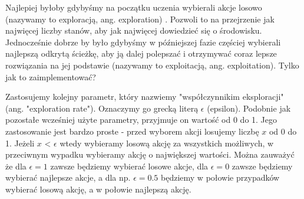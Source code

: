 \documentclass[a4paper,12pt]{article}
\begin{document}
Najlepiej byłoby gdybyśmy na początku uczenia wybierali akcje losowo (nazywamy to exploracją, ang. exploration) . Pozwoli to na przejrzenie jak najwięcej liczby stanów, aby jak najwięcej dowiedzieć się o środowisku. Jednocześnie dobrze by było gdybyśmy w późniejszej fazie częściej wybierali najlepszą odkrytą ścieżkę, aby ją dalej polepszać i otrzymywać coraz lepsze rozwiązania na jej podstawie (nazywamy to exploitacją, ang. exploitation). Tylko jak to zaimplementować?

Zastosujemy kolejny parametr, który nazwiemy "współczynnikim eksploracji" (ang. "exploration rate"). Oznaczymy go grecką literą \(\epsilon\) (epsilon). Podobnie jak pozostałe wcześniej użyte parametry, przyjmuje on wartość od 0 do 1. Jego zastosowanie jest bardzo proste - przed wyborem akcji losujemy liczbę \(x\) od 0 do 1. Jeżeli \(x\) < \(\epsilon\) wtedy wybieramy losową akcję za wszystkich możliwych, w przeciwnym wypadku wybieramy akcję o największej wartości. Można zauważyć że dla \(\epsilon = 1\) zawsze będziemy wybierać losowe akcje, dla \(\epsilon = 0\) zawsze będziemy wybierać najlepsze akcje, a dla np. \(\epsilon = 0.5\) będziemy w połowie przypadków wybierać losową akcję, a w połowie najlepszą akcję.
\end{document}
